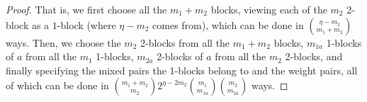 \documentclass[11pt,reqno]{amsart}
\numberwithin{equation}{section}
\theoremstyle{plain}
\begin{document}
\begin{proof}


That is, we first choose all the $m_1+m_2$ blocks, viewing each of the $m_2$ 2-block as a $1$-block (where $\eta-m_2$ comes from), which can be done in $\binom{\eta-m_2}{m_1+m_2}$ ways. Then, we choose the $m_2$ 2-blocks from all the $m_1+m_2$ blocks, $m_{1a}$ 1-blocks of $a$ from all the $m_1$ 1-blocks, $m_{2a}$ 2-blocks of $a$ from all the $m_2$ 2-blocks, and finally specifying the mixed pairs the 1-blocks belong to and the weight pairs, all of which can be done in $\binom{m_1+m_2}{m_2}2^{\eta-2m_2}\binom{m_1}{m_{1a}}\binom{m_2}{m_{2a}}$ ways.


\end{proof}
\end{document}
